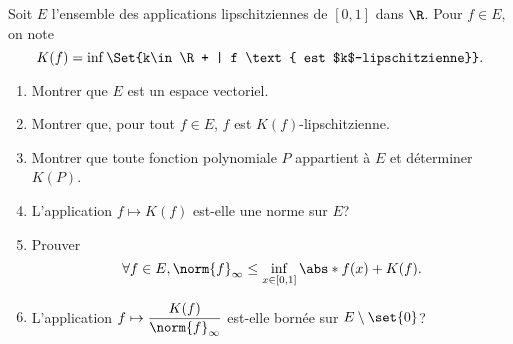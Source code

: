 \begin{enonce}
\begin{exercise}[ID={RMS135 E910},subtitle={Mines-Ponts PSI 2024},tags={oraux},difficulty={}]
  Soit $E$ l'ensemble des applications lipschitziennes de $[0,1]$ dans $\R$.
  Pour $f\in E$, on note
  \begin{equation*}
    K(f) = \inf\Set{k\in\R+ | f \text{ est $k$-lipschitzienne}}.
  \end{equation*}

  \begin{enumerate}
    \item Montrer que $E$ est un espace vectoriel.

    \item Montrer que, pour tout $f\in E$, $f$ est $K(f)$-lipschitzienne.

    \item Montrer que toute fonction polynomiale $P$ appartient à $E$ et déterminer $K(P)$.

    \item L'application $f\mapsto K(f)$ est-elle une norme sur $E$?

    \item Prouver
      \begin{equation*}
        \forall f\in E, \norm{f}_{\infty} \leq \inf_{x\in[0,1]} \abs*{f(x)} + K(f).
      \end{equation*}

    \item L'application $f\mapsto \displaystyle\frac{K(f)}{\norm{f}_{\infty}}$ est-elle bornée sur $E\setminus\set{0}$?
  \end{enumerate}
\end{exercise}
\begin{solution}
\end{solution}
\end{enonce}
